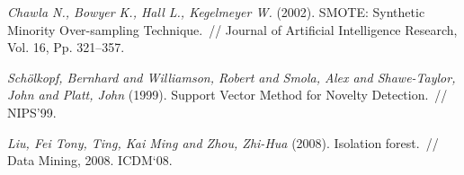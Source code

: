 \documentclass[12pt,fleqn]{article}
\begin{document}
\begin{thebibliography}{1}
    \emph{Chawla N., Bowyer K., Hall L., Kegelmeyer W.} (2002).
    SMOTE: Synthetic Minority Over-sampling Technique.~//
    Journal of Artificial Intelligence Research, Vol. 16, Pp. 321–357.

    \emph{Sch\"{o}lkopf, Bernhard and Williamson, Robert and Smola, Alex and Shawe-Taylor, John and Platt, John} (1999).
    Support Vector Method for Novelty Detection.~//
    NIPS'99.

    \emph{Liu, Fei Tony, Ting, Kai Ming and Zhou, Zhi-Hua} (2008).
    Isolation forest.~//
    Data Mining, 2008. ICDM‘08.
\end{thebibliography}
\end{document}
